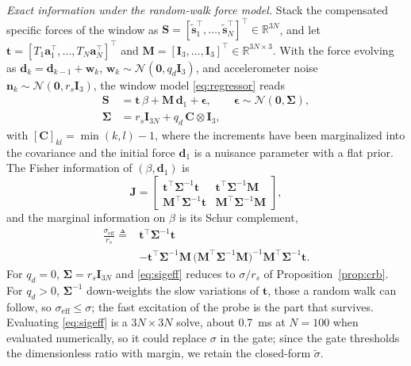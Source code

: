 \documentclass{ieeeaccess}
\newcommand{\R}{\mathbb{R}}
\newcommand{\vect}[1]{\bm{#1}}
\newcommand{\mat}[1]{\mathbf{#1}}
\begin{document}
\emph{Exact information under the random-walk force model.} Stack the compensated specific forces of the window as
$\vect{S}=[\tilde{\vect{s}}_1^{\!\top},\dots,\tilde{\vect{s}}_N^{\!\top}]^{\!\top}\in\R^{3N}$,
and let $\vect{t}=[T_1\vect{a}_1^{\!\top},\dots,T_N\vect{a}_N^{\!\top}]^{\!\top}$ and
$\mat{M}=[\mat{I}_3,\dots,\mat{I}_3]^{\!\top}\in\R^{3N\times3}$. With the force
evolving as $\vect{d}_k=\vect{d}_{k-1}+\vect{w}_k$,
$\vect{w}_k\sim\mathcal{N}(\vect{0},q_d\mat{I}_3)$, and accelerometer noise
$\vect{n}_k\sim\mathcal{N}(\vect{0},r_s\mat{I}_3)$, the window model
\eqref{eq:regressor} reads
\begin{equation}
\begin{aligned}
\vect{S}&=\vect{t}\,\beta+\mat{M}\,\vect{d}_1+\vect{\epsilon},\qquad
\vect{\epsilon}\sim\mathcal{N}(\vect{0},\mat{\Sigma}),\\
\mat{\Sigma}&=r_s\mat{I}_{3N}+q_d\,\mat{C}\otimes\mat{I}_3,
\end{aligned}
\label{eq:rwmodel}
\end{equation}
with $[\mat{C}]_{kl}=\min(k,l)-1$, where the increments have been marginalized into
the covariance and the initial force $\vect{d}_1$ is a nuisance parameter with a
flat prior. The Fisher information of $(\beta,\vect{d}_1)$ is
\begin{equation}
\mat{J}=
\begin{bmatrix}
\vect{t}^{\!\top}\mat{\Sigma}^{-1}\vect{t} & \vect{t}^{\!\top}\mat{\Sigma}^{-1}\mat{M}\\[2pt]
\mat{M}^{\!\top}\mat{\Sigma}^{-1}\vect{t} & \mat{M}^{\!\top}\mat{\Sigma}^{-1}\mat{M}
\end{bmatrix},
\end{equation}
and the marginal information on $\beta$ is its Schur complement,
\begin{equation}
\begin{aligned}
\frac{\sigma_{\mathrm{eff}}}{r_s}\triangleq{}&
\vect{t}^{\!\top}\mat{\Sigma}^{-1}\vect{t}\\
&-\vect{t}^{\!\top}\mat{\Sigma}^{-1}\mat{M}\,
\big(\mat{M}^{\!\top}\mat{\Sigma}^{-1}\mat{M}\big)^{-1}
\mat{M}^{\!\top}\mat{\Sigma}^{-1}\vect{t}.
\end{aligned}
\label{eq:sigeff}
\end{equation}
For $q_d=0$, $\mat{\Sigma}=r_s\mat{I}_{3N}$ and \eqref{eq:sigeff} reduces to
$\sigma/r_s$ of Proposition~\ref{prop:crb}. For $q_d>0$, $\mat{\Sigma}^{-1}$
down-weights the slow variations of $\vect{t}$, those a random walk can follow, so
$\sigma_{\mathrm{eff}}\leq\sigma$; the fast excitation of the probe is the part
that survives. Evaluating \eqref{eq:sigeff} is a $3N\times3N$ solve,
about \SI{0.7}{\milli\second} at $N=100$ when evaluated numerically, so it could replace $\sigma$ in the
gate; since the gate thresholds the dimensionless ratio with margin, we retain the
closed-form $\tilde\sigma$.
\end{document}
